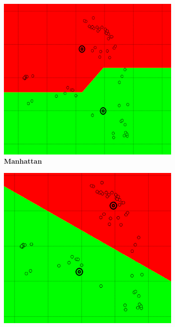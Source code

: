 \begin{figure} [ht]
\centering
	\begin{subfigure}[h]{0.23\textwidth}
    \centering
	\includegraphics[height=0.08\textheight]{./clustering/l1norm.png}
	\caption{\bf Manhattan}
	\end{subfigure}
    \begin{subfigure}[h]{0.23\textwidth}
    \centering
    \includegraphics[height=0.08\textheight]{./clustering/l2norm.png}

\end{subfigure}
\end{figure}
